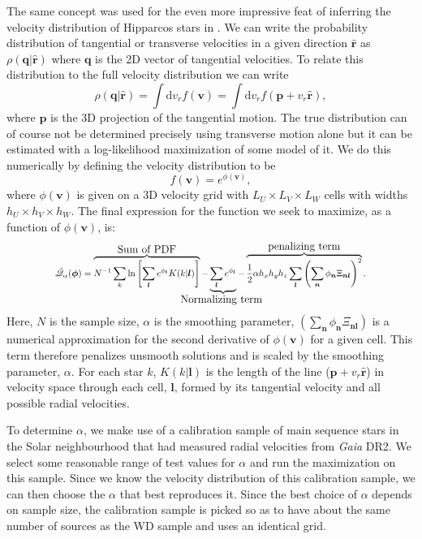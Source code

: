 The same concept was used for the even more impressive feat of inferring the velocity distribution of Hipparcos stars in \cite{dehnen:98a}. We can write the probability distribution of tangential or transverse velocities in a given direction $\hat{\bm{r}}$ as $\rho(\bm{q|\hat{\bm{r}}})$ where $\bm{q}$ is the 2D vector of tangential velocities. To relate this distribution to the full velocity distribution we can write
\begin{equation}
    \rho(\bm{q|\hat{\bm{r}}}) = \int \mathrm{d}v_r f(\bm{v}) = \int \mathrm{d}v_r f(\bm{p} + v_r\hat{\bm{r}}),
\end{equation}
where $\bm{p}$ is the 3D projection of the tangential motion. The true distribution can of course not be determined precisely using transverse motion alone but it can be estimated with a log-likelihood maximization of some model of it. We do this numerically by defining the velocity distribution to be
\begin{equation}
    f(\bm{v}) = e^{\phi(\bm{v})},
\end{equation}
where $\phi(\bm{v})$ is given on a 3D velocity grid with $L_U\times L_V\times L_W$ cells with widths $h_U\times h_V\times h_W$. The final expression for the function we seek to maximize, as a function of $\phi(\bm{v})$, is: 
\begin{equation}\label{eq:mple}
    \scalemath{0.8}{\tilde{\mathscr{Q}}_\alpha(\bm{\phi}) = 
    \overbrace{N^{-1}\sum_{k} \ln \left[\sum_{\bm{l}}e^{\phi_{\bm{l}}}K(k|\bm{l})\right]}^\text{\large Sum of PDF} - 
    \underbrace{\sum_{\bm{l}}e^{\phi_{\bm{l}}}}_\text{\large \hbox to 0cm{\hss Normalizing term \hss}} - 
    \overbrace{\frac{1}{2}\alpha h_xh_yh_z\sum_{\bm{l}}\left(\sum_{\bm{n}} \phi_{\bm{n}}\Xi_{\bm{n}\bm{l}}\right)^2}^\text{\large penalizing term}.
    }
\end{equation}
Here, $N$ is the sample size, $\alpha$ is the smoothing parameter, $\left(\sum_{\bm{n}} \phi_{\bm{n}}\Xi_{\bm{n}\bm{l}}\right)$ is a numerical approximation for the second derivative of $\phi(\bm{v})$ for a given cell. This term therefore penalizes unsmooth solutions and is scaled by the smoothing parameter, $\alpha$. For each star $k$, $K(k|\bm{l})$ is the length of the line ($\bm{p} + v_r\hat{\bm{r}}$) in velocity space through each cell, $\bm{l}$, formed by its tangential velocity and all possible radial velocities. 

To determine $\alpha$, we make use of a calibration sample of main sequence stars in the Solar neighbourhood that had measured radial velocities from \textit{Gaia} DR2. We select some reasonable range of test values for $\alpha$ and run the maximization on this sample. Since we know the velocity distribution of this calibration sample, we can then choose the $\alpha$ that best reproduces it. Since the best choice of $\alpha$ depends on sample size, the calibration sample is picked so as to have about the same number of sources as the WD sample and uses an identical grid.

